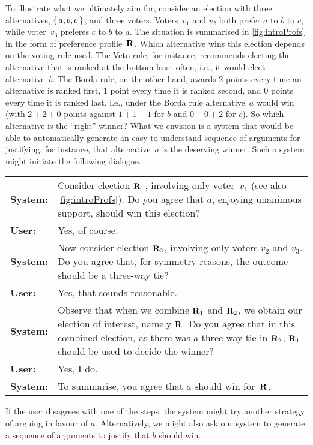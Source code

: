 \documentclass{comsoc2016}
\begin{document}
\begin{example}\label{ex:intro}
To illustrate what we ultimately aim for, consider an election with three alternatives, $\set{a,b,c}$, and three voters. Voters~$v_1$ and $v_2$ both prefer $a$ to $b$ to $c$, while voter~$v_3$ preferes $c$ to $b$ to $a$. The situation is summarised in \cref{fig:introProfs} in the form of preference profile~$\mathbf{R}$. Which alternative wins this election depends on the voting rule used. The Veto rule, for instance, recommends electing the alternative that is ranked at the bottom least often, i.e., it would elect alternative~$b$. The Borda rule, on the other hand, awards 2 points every time an alternative is ranked first, 1 point every time it is ranked second, and 0 points every time it is ranked last, i.e., under the Borda rule alternative~$a$ would win (with $2+2+0$ points against $1+1+1$ for $b$ and $0+0+2$ for $c$). So which alternative is the ``right'' winner? What we envision is a system that would be able to automatically generate an easy-to-understand sequence of arguments for justifying, for instance, that alternative~$a$ is the deserving winner. Such a system might initiate the following dialogue.
\begin{center}\small\begin{tabular}{@{}l@{\;\;}p{11cm}@{}}
\textbf{System:} & Consider election $\mathbf{R}_1$, involving only voter~$v_1$ (see also \cref{fig:introProfs}). Do you agree that $a$, enjoying unanimous support, should win this election? \\[2pt]
\textbf{User:} & Yes, of course. \\[2pt]
\textbf{System:} & Now consider election $\mathbf{R}_2$, involving only voters $v_2$ and $v_3$. Do you agree that, for symmetry reasons, the outcome should be a three-way tie? \\[2pt]
\textbf{User:} & Yes, that sounds reasonable. \\[2pt]
\textbf{System:} & Observe that when we combine $\mathbf{R}_1$ and $\mathbf{R}_2$, we obtain our election of interest, namely $\mathbf{R}$. Do you agree that in this combined election, as there was a three-way tie in $\mathbf{R}_2$, $\mathbf{R}_1$ should be used to decide the winner? \\[2pt]
\textbf{User:} & Yes, I do. \\[2pt]
\textbf{System:} & To summarise, you agree that $a$ should win for~$\mathbf{R}$.
\end{tabular}\end{center}

If the user disagrees with one of the steps, the system might try another strategy of arguing in favour of $a$.
Alternatively, we might also ask our system to generate a sequence of arguments to justify that $b$ should win.
\end{example}
\end{document}
